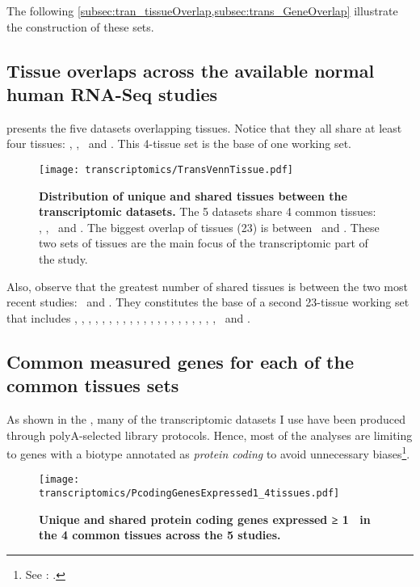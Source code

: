 The following \cref{subsec:tran_tissueOverlap,subsec:trans_GeneOverlap}
illustrate the construction of these sets.

\subsection{Tissue overlaps across the available normal human RNA-Seq studies}
\label{subsec:tran_tissueOverlap}

 presents the five datasets overlapping tissues.
Notice that they all share at least four tissues:
\heart, \kidney, \liver\ and \testis.
This 4-tissue set is the base of one working set.

\begin{figure}[h]%
\texttt{[image: transcriptomics/TransVennTissue.pdf]}\centering
\caption[Distribution of unique and shared tissues between the
transcriptomic datasets]
{\label{fig:VennStudiesT}\textbf{Distribution of unique and shared tissues
between the transcriptomic datasets.} The 5 datasets share 4
common tissues: \heart, \kidney, \liver\ and \testis.
The biggest overlap of tissues (23) is between \uhlen\ and \gtex.
These two sets of tissues are the main focus of the transcriptomic part of the
study.}
\end{figure}

Also, observe that the greatest number of shared tissues is
between the two most recent studies:
\uhlen\ and \gtex.
They constitutes the base of a second 23-tissue working set that includes
\Adipose, \Adrenal, \Bladder, \Cortex, \hcolon, \Esophagus,
\Fallopian, \heart, \kidney, \liver, \lung, \Ovary, \Pancreas, \Prostate,
\salivary, \skeletal, \skin, \intestine, \spleen, \stomach, \testis,
\thyroid\ and \uterus.

\subsection{Common measured genes for each of the common tissues sets}
\label{subsec:trans_GeneOverlap}
As shown in the ,
many of the transcriptomic datasets I use have been produced through
polyA-selected library protocols.
Hence, most of the analyses are limiting to genes with a biotype annotated as
\emph{protein coding}
to avoid unnecessary biases\footnote{See
: .}.

\begin{figure}[!htpb]
    \texttt{[image: transcriptomics/PcodingGenesExpressed1\_4tissues.pdf]}\centering
    \caption[Unique and shared protein coding genes expressed
    in the 4 common tissues (≥1 \FPKM)]{\label{fig:ExpGenePcoding1}\textbf{Unique
    and shared protein coding genes expressed ≥ 1 \FPKM\ in the 4 common tissues
    across the 5 studies.}}
\end{figure}

